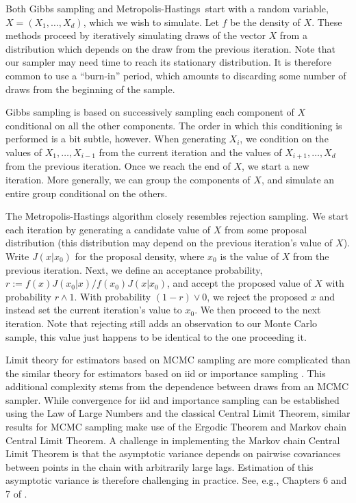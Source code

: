 \documentclass[11pt, oneside]{article}   	%
\newcommand{\mh}{Metropolis-Hastings}
\begin{document}
Both Gibbs sampling and \mh\ start with a random variable, $X = (X_1, \ldots, X_d)$, which we wish to simulate. Let $f$ be the density of $X$. These methods proceed by iteratively simulating draws of the vector $X$ from a distribution which depends on the draw from the previous iteration. Note that our sampler may need time to reach its stationary distribution. It is therefore common to use a ``burn-in'' period, which amounts to discarding some number of draws from the beginning of the sample.

Gibbs sampling is based on successively sampling each component of $X$ conditional on all the other components. The order in which this conditioning is performed is a bit subtle, however. When generating $X_i$, we condition on the values of $X_1,\ldots, X_{i-1}$ from the current iteration and the values of $X_{i+1}, \ldots, X_d$ from the previous iteration. Once we reach the end of $X$, we start a new iteration.  More generally, we can group the components of $X$, and simulate an entire group conditional on the others.

The Metropolis-Hastings algorithm closely resembles rejection sampling. We start each iteration by generating a candidate value of $X$ from some proposal distribution (this distribution may depend on the previous iteration's value of $X$). Write $J(x | x_0)$ for the proposal density, where $x_0$ is the value of $X$ from the previous iteration. Next, we define an acceptance probability, $r := f(x) J(x_0 | x) / f(x_0) J(x | x_0)$, and accept the proposed value of $X$ with probability $r \wedge 1$. With probability $(1-r) \vee 0$, we reject the proposed $x$ and instead set the current iteration's value to $x_0$. We then proceed to the next iteration. Note that rejecting still adds an observation to our Monte Carlo sample, this value just happens to be identical to the one proceeding it.

Limit theory for estimators based on MCMC sampling are more complicated than the similar theory for estimators based on iid or importance sampling \citep{Gey91}. This additional complexity stems from the dependence between draws from an MCMC sampler. While convergence for iid and importance sampling can be established using the Law of Large Numbers and the classical Central Limit Theorem, similar results for MCMC sampling make use of the Ergodic Theorem and Markov chain Central Limit Theorem. A challenge in implementing the Markov chain Central Limit Theorem is that the asymptotic variance depends on pairwise covariances between points in the chain with arbitrarily large lags. Estimation of this asymptotic variance is therefore challenging in practice. See, e.g., Chapters 6 and 7 of \citet{Rob04}.
\end{document}
